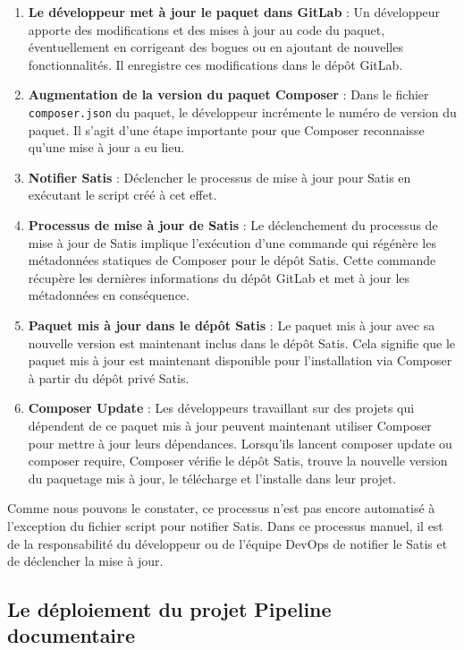 \begin{enumerate}
    \item \textbf{Le développeur met à jour le paquet dans GitLab} : Un développeur apporte des modifications et des mises à jour au code du paquet, éventuellement en corrigeant des bogues ou en ajoutant de nouvelles fonctionnalités. Il enregistre ces modifications dans le dépôt GitLab.
    \item \textbf{Augmentation de la version du paquet Composer} : Dans le fichier \texttt{composer.json} du paquet, le développeur incrémente le numéro de version du paquet. Il s'agit d'une étape importante pour que Composer reconnaisse qu'une mise à jour a eu lieu.
    \item \textbf{Notifier Satis} : Déclencher le processus de mise à jour pour Satis en exécutant le script créé à cet effet.
    \item \textbf{Processus de mise à jour de Satis} : Le déclenchement du processus de mise à jour de Satis implique l'exécution d'une commande qui régénère les métadonnées statiques de Composer pour le dépôt Satis. Cette commande récupère les dernières informations du dépôt GitLab et met à jour les métadonnées en conséquence.
    \item \textbf{Paquet mis à jour dans le dépôt Satis} : Le paquet mis à jour avec sa nouvelle version est maintenant inclus dans le dépôt Satis. Cela signifie que le paquet mis à jour est maintenant disponible pour l'installation via Composer à partir du dépôt privé Satis.
    \item \textbf{Composer Update} : Les développeurs travaillant sur des projets qui dépendent de ce paquet mis à jour peuvent maintenant utiliser Composer pour mettre à jour leurs dépendances. Lorsqu'ils lancent composer update ou composer require, Composer vérifie le dépôt Satis, trouve la nouvelle version du paquetage mis à jour, le télécharge et l'installe dans leur projet.
\end{enumerate}

Comme nous pouvons le constater, ce processus n'est pas encore automatisé à l'exception du fichier script pour notifier Satis. Dans ce processus manuel, il est de la responsabilité du développeur ou de l'équipe DevOps de notifier le Satis et de déclencher la mise à jour.

\subsection{Le déploiement du projet Pipeline documentaire}

